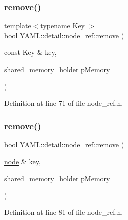 \subsubsection{\texorpdfstring{remove()}{remove()}\hspace{0.1cm}{\footnotesize\ttfamily [1/2]}}
{\footnotesize\ttfamily template$<$typename Key $>$ \\
bool Y\+A\+M\+L\+::detail\+::node\+\_\+ref\+::remove (\begin{DoxyParamCaption}\item[{const \mbox{\hyperlink{namespace_y_a_m_l_a67c320aa50d3de7ecba1d0b8775dd684a1af533fc24b0311b8c4d5ac2870283aa}{Key}} \&}]{key,  }\item[{\mbox{\hyperlink{namespace_y_a_m_l_1_1detail_a228c4b3b6ba1058b474d40afc218e21d}{shared\+\_\+memory\+\_\+holder}}}]{p\+Memory }\end{DoxyParamCaption})\hspace{0.3cm}{\ttfamily [inline]}}



Definition at line 71 of file node\+\_\+ref.\+h.

\mbox{\label{class_y_a_m_l_1_1detail_1_1node__ref_a2fdfda0864761192f51a031e018d12ae}} 
\subsubsection{\texorpdfstring{remove()}{remove()}\hspace{0.1cm}{\footnotesize\ttfamily [2/2]}}
{\footnotesize\ttfamily bool Y\+A\+M\+L\+::detail\+::node\+\_\+ref\+::remove (\begin{DoxyParamCaption}\item[{\mbox{\hyperlink{class_y_a_m_l_1_1detail_1_1node}{node}} \&}]{key,  }\item[{\mbox{\hyperlink{namespace_y_a_m_l_1_1detail_a228c4b3b6ba1058b474d40afc218e21d}{shared\+\_\+memory\+\_\+holder}}}]{p\+Memory }\end{DoxyParamCaption})\hspace{0.3cm}{\ttfamily [inline]}}



Definition at line 81 of file node\+\_\+ref.\+h.

\mbox{\label{class_y_a_m_l_1_1detail_1_1node__ref_a45438a60ee1b8a64699d130cf96ffbb6}} 
